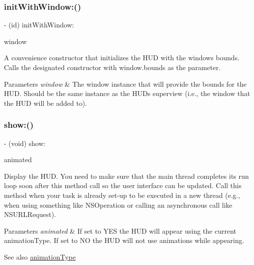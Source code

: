 \subsubsection{\texorpdfstring{init\+With\+Window\+:()}{initWithWindow:()}\hspace{0.1cm}{\footnotesize\ttfamily [3/3]}}
{\footnotesize\ttfamily -\/ (id) init\+With\+Window\+: \begin{DoxyParamCaption}\item[{(U\+I\+Window $\ast$)}]{window }\end{DoxyParamCaption}}

A convenience constructor that initializes the H\+UD with the window\textquotesingle{}s bounds. Calls the designated constructor with window.\+bounds as the parameter.


\begin{DoxyParams}{Parameters}
{\em window} & The window instance that will provide the bounds for the H\+UD. Should be the same instance as the H\+UD\textquotesingle{}s superview (i.\+e., the window that the H\+UD will be added to). \\
\hline
\end{DoxyParams}
\mbox{\label{interface_m_b_progress_h_u_d_a3ef075a3be624c2f94629d63bfeae25b}} 
\subsubsection{\texorpdfstring{show\+:()}{show:()}\hspace{0.1cm}{\footnotesize\ttfamily [1/3]}}
{\footnotesize\ttfamily -\/ (void) show\+: \begin{DoxyParamCaption}\item[{(B\+O\+OL)}]{animated }\end{DoxyParamCaption}}

Display the H\+UD. You need to make sure that the main thread completes its run loop soon after this method call so the user interface can be updated. Call this method when your task is already set-\/up to be executed in a new thread (e.\+g., when using something like N\+S\+Operation or calling an asynchronous call like N\+S\+U\+R\+L\+Request).


\begin{DoxyParams}{Parameters}
{\em animated} & If set to Y\+ES the H\+UD will appear using the current animation\+Type. If set to NO the H\+UD will not use animations while appearing.\\
\hline
\end{DoxyParams}
\begin{DoxySeeAlso}{See also}
\mbox{\hyperlink{interface_m_b_progress_h_u_d_a71d04bb9e2839df9377ad10d03b2e468}{animation\+Type}} 
\end{DoxySeeAlso}
\mbox{\label{interface_m_b_progress_h_u_d_a3ef075a3be624c2f94629d63bfeae25b}} 

